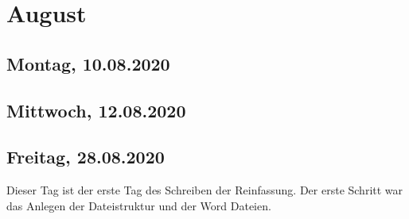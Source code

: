 \documentclass[../main.tex]{subfiles}
\begin{document}
	\section{August}
	
	\subsection{Montag, 10.08.2020}
		
	
	
	\subsection{Mittwoch, 12.08.2020}
	
	
	
	
	\subsection{Freitag, 28.08.2020}
	Dieser Tag ist der erste Tag des Schreiben der Reinfassung.
	Der erste Schritt war das Anlegen der Dateistruktur und der Word Dateien.
	
\end{document}
